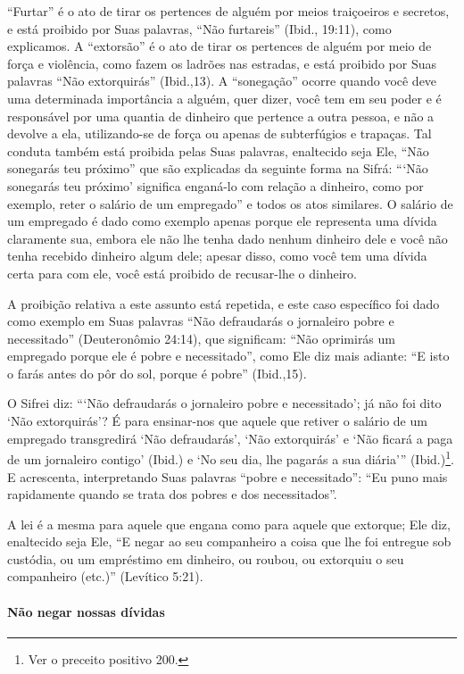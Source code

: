 ``Furtar'' é o ato de tirar os pertences de alguém por meios
traiçoeiros e secretos, e está proibido por Suas palavras, ``Não
furtareis'' (Ibid., 19:11), como explicamos. A ``extorsão'' é o ato de
tirar os pertences de alguém por meio de força e violência, como fazem
os ladrões nas estradas, e está proibido por Suas palavras ``Não
extorquirás'' (Ibid.,13). A ``sonegação'' ocorre quando você deve uma
determinada importância a alguém, quer dizer, você tem em seu poder e é
responsável por uma quantia de dinheiro que pertence a outra pessoa, e
não a devolve a ela, utilizando-se de força ou apenas de subterfúgios e
trapaças. Tal conduta também está proibida pelas Suas palavras,
enaltecido seja Ele, ``Não sonegarás teu próximo'' que são explicadas da
seguinte forma na Sifrá: ```Não sonegarás teu próximo' significa
enganá-lo com relação a dinheiro, como por exemplo, reter o salário de
um empregado'' e todos os atos similares. O salário de um empregado é
dado como exemplo apenas porque ele representa uma dívida claramente
sua, embora ele não lhe tenha dado nenhum dinheiro dele e você não
tenha recebido dinheiro algum dele; apesar disso, como você tem uma
dívida certa para com ele, você está proibido de recusar-lhe o dinheiro.

A proibição relativa a este assunto está repetida, e este caso
específico foi dado como exemplo em Suas palavras ``Não defraudarás o
jornaleiro pobre e necessitado'' (Deuteronômio 24:14), que significam:
``Não oprimirás um empregado porque ele é pobre e necessitado'', como
Ele diz mais adiante: ``E isto o farás antes do pôr do sol, porque é
pobre'' (Ibid.,15).

O Sifrei diz: ```Não defraudarás o jornaleiro pobre e necessitado'; já
não foi dito `Não extorquirás'? É para ensinar-nos que aquele que
retiver o salário de um empregado transgredirá `Não defraudarás', `Não
extorquirás' e `Não ficará a paga de um jornaleiro contigo' (Ibid.) e
`No seu dia, lhe pagarás a sua diária''' (Ibid.)\footnote{Ver o preceito positivo 200.}. E acrescenta, interpretando Suas
palavras ``pobre e necessitado'': ``Eu puno mais rapidamente quando se
trata dos pobres e dos necessitados''.

A lei é a mesma para aquele que engana como para aquele que extorque;
Ele diz, enaltecido seja Ele, ``E negar ao seu companheiro a coisa que
lhe foi entregue sob custódia, ou um empréstimo em dinheiro, ou roubou,
ou extorquiu o seu companheiro (etc.)'' (Levítico 5:21).

\paragraph{Não negar nossas dívidas}


